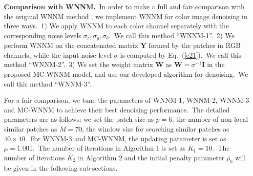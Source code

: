 \textbf{Comparison with WNNM.}\
In order to make a full and fair comparison with the original WNNM method \cite{wnnmijcv}, we implement WNNM for color image denoising in three ways.\ 
1) We apply WNNM to each color channel separately with the corresponding noise levels $\sigma_{r}, \sigma_{g}, \sigma_{b}$.\ We call this method ``WNNM-1''.\
2) We perform WNNM on the concatenated matrix $\mathbf{Y}$ formed by the patches in RGB channels, while the input noise level $\sigma$ is computed by Eq.\ (\ref{e21}).\ We call this method ``WNNM-2''.\
3) We set the weight matrix $\mathbf{W}$ as $\mathbf{W}=\sigma^{-1}\mathbf{I}$ in the proposed MC-WNNM model, and use our developed algorithm for denoising.\ We call this method ``WNNM-3''.

For a fair comparison, we tune the parameters of WNNM-1, WNNM-2, WNNM-3 and MC-WNNM to achieve their best denoising performance.\ The detailed parameters are as follows: we set the patch size as $p = 6$, the number of non-local similar patches as $M = 70$, the window size for searching similar patches as $40\times40$.\ For WNNM-3 and MC-WNNM, the updating parameter is set as $\mu=1.001$.\ The number of iterations in Algorithm 1 is set as $K_{1} = 10$.\ The number of iterations $K_{2}$ in Algorithm 2 and the initial penalty parameter $\rho_{0}$ will be given in the following sub-sections.


